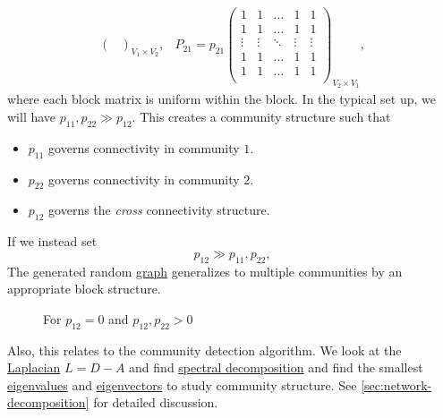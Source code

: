 \begin{eg}
\[\begin{split}
\begin{pmatrix}
			\end{pmatrix}_{V_1 \times V_2}, &
			P_{21} = p_{21}\begin{pmatrix}
				1      & 1      & \ldots & 1      & 1      \\
				1      & 1      & \ldots & 1      & 1      \\
				\vdots & \vdots & \ddots & \vdots & \vdots \\
				1      & 1      & \ldots & 1      & 1      \\
				1      & 1      & \ldots & 1      & 1      \\
			\end{pmatrix}_{V_2 \times V_1},
		\end{split}
	\]
	where each block matrix is uniform within the block. In the typical set up, we will have \(p_{11}, p_{22} \gg p_{12}\).
	This creates a community structure such that
	\begin{itemize}
		\item \(p_{11}\) governs connectivity in community \(1\).
		\item \(p_{22}\) governs connectivity in community \(2\).
		\item \(p_{12}\) governs the \emph{cross} connectivity structure.
	\end{itemize}

	\begin{remark}
		If we instead set
		\[
			p_{12}\gg p_{11}, p_{22},
		\]
		The generated random \hyperref[def:graph]{graph} generalizes to multiple communities by an appropriate block structure.

		\begin{figure}[H]
			\centering
			\caption{For \(p_{12}=0\) and \(p_{12}, p_{22}>0\)}
			\label{fig:bipartite-graph-generalization}
		\end{figure}

		Also, this relates to the community detection algorithm. We look at the \hyperref[def:Laplacian]{Laplacian} \(L = D - A\)
		and find \hyperref[thm:eigen-decomposition]{spectral decomposition} and find the smallest \hyperref[def:eigenvalue]{eigenvalues}
		and \hyperref[def:eigenvector]{eigenvectors} to study community structure. See \autoref{sec:network-decomposition} for detailed
		discussion.
	\end{remark}
\end{eg}

